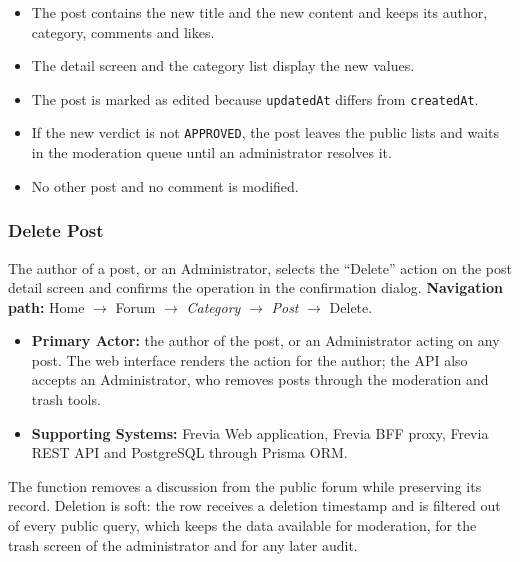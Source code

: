 \begin{itemize}[leftmargin=1.6em,topsep=3pt,itemsep=2pt,parsep=0pt,label=$\bullet$]
      \item The post contains the new title and the new content and keeps its author,
            category, comments and likes.
      \item The detail screen and the category list display the new values.
      \item The post is marked as edited because \texttt{updatedAt} differs from
            \texttt{createdAt}.
      \item If the new verdict is not \texttt{APPROVED}, the post leaves the public lists
            and waits in the moderation queue until an administrator resolves it.
      \item No other post and no comment is modified.
\end{itemize}


\subsubsection{ Delete Post}

The author of a post, or an Administrator, selects the ``Delete'' action on the post detail screen
and confirms the operation in the confirmation dialog.\newline
\textbf{Navigation path:} Home $\rightarrow$ Forum $\rightarrow$ \textit{Category} $\rightarrow$
\textit{Post} $\rightarrow$ Delete.


\begin{itemize}[leftmargin=1.6em,topsep=3pt,itemsep=2pt,parsep=0pt,label=$\bullet$]
      \item \textbf{Primary Actor:} the author of the post, or an Administrator acting on any post.
            The web interface renders the action for the author; the API also accepts an
            Administrator, who removes posts through the moderation and trash tools.
      \item \textbf{Supporting Systems:} Frevia Web application, Frevia BFF proxy, Frevia REST API
            and PostgreSQL through Prisma ORM.
\end{itemize}

\noindent The function removes a discussion from the public forum while preserving its record.
Deletion is soft: the row receives a deletion timestamp and is filtered out of every public
query, which keeps the data available for moderation, for the trash screen of the administrator
and for any later audit.

